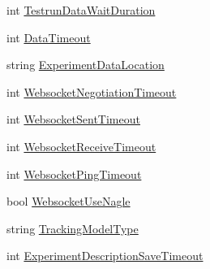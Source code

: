 \begin{DoxyCompactItemize}
\item 
int \hyperlink{class_web_analyzer_1_1_properties_1_1_settings_a4fa938c23f07358746ab269d717fd087}{Testrun\+Data\+Wait\+Duration}
\item 
int \hyperlink{class_web_analyzer_1_1_properties_1_1_settings_a0c6ee531ecb7669be322d0b6adbbed8a}{Data\+Timeout}
\item 
string \hyperlink{class_web_analyzer_1_1_properties_1_1_settings_ac417a6538207823d18cdddedf21e8313}{Experiment\+Data\+Location}
\item 
int \hyperlink{class_web_analyzer_1_1_properties_1_1_settings_a65f41aa49303ec4c86675777f44ed32e}{Websocket\+Negotiation\+Timeout}
\item 
int \hyperlink{class_web_analyzer_1_1_properties_1_1_settings_ae53e9129c252eb6a1d2d1c475e6cd8b7}{Websocket\+Sent\+Timeout}
\item 
int \hyperlink{class_web_analyzer_1_1_properties_1_1_settings_adeca98009c11d4d6154200db60e347a9}{Websocket\+Receive\+Timeout}
\item 
int \hyperlink{class_web_analyzer_1_1_properties_1_1_settings_a5fd4f365831db1d8338abbcaac13235c}{Websocket\+Ping\+Timeout}
\item 
bool \hyperlink{class_web_analyzer_1_1_properties_1_1_settings_afabd82687970641a0e6ac78e36cf83d6}{Websocket\+Use\+Nagle}
\item 
string \hyperlink{class_web_analyzer_1_1_properties_1_1_settings_aadead79f8564c500dc5de1f7650254aa}{Tracking\+Model\+Type}
\item 
int \hyperlink{class_web_analyzer_1_1_properties_1_1_settings_a7db527e5e557a63fa96cafc8b76b05d5}{Experiment\+Description\+Save\+Timeout}

\end{DoxyCompactItemize}
